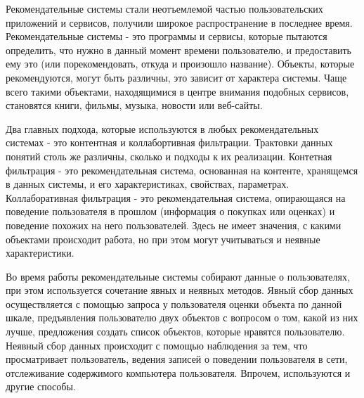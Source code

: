 







\Intro

Рекомендательные системы стали неотъемлемой частью пользовательских приложений и сервисов, получили широкое распространение в последнее время. Рекомендательные системы - это программы и сервисы, которые пытаются определить, что нужно в данный момент времени пользователю, и предоставить ему это (или порекомендовать, откуда и произошло название). Объекты, которые рекомендуются, могут быть различны, это зависит от характера системы. Чаще всего такими объектами, находящимися в центре внимания подобных сервисов, становятся книги, фильмы, музыка, новости или веб-сайты.

Два главных подхода, которые используются в любых рекомендательных системах - это контентная и коллабортивная фильтрации. Трактовки данных понятий столь же различны, сколько и подходы к их реализации. Контетная фильтрация - это рекомендательная система, основанная на контенте, хранящемся в данных системы, и его характеристиках, свойствах, параметрах. Коллаборативная фильтрация - это рекомендательная система, опирающаяся на поведение пользователя в прошлом (информация о покупках или оценках) и поведение похожих на него пользователей. Здесь не имеет значения, с какими объектами происходит работа, но при этом могут учитываться и неявные характеристики.

Во время работы рекомендательные системы собирают данные о пользователях, при этом используется сочетание явных и неявных методов. Явный сбор данных осуществляется с помощью запроса у пользователя оценки объекта по данной шкале, 
предъявления пользователю двух объектов с вопросом о том, какой из них лучше,
предложения создать список объектов, которые нравятся пользователю. Неявный сбор данных происходит с помощью наблюдения за тем, что просматривает пользователь, ведения записей о поведении пользователя в сети, отслеживание содержимого компьютера пользователя. Впрочем, используются и другие способы.


